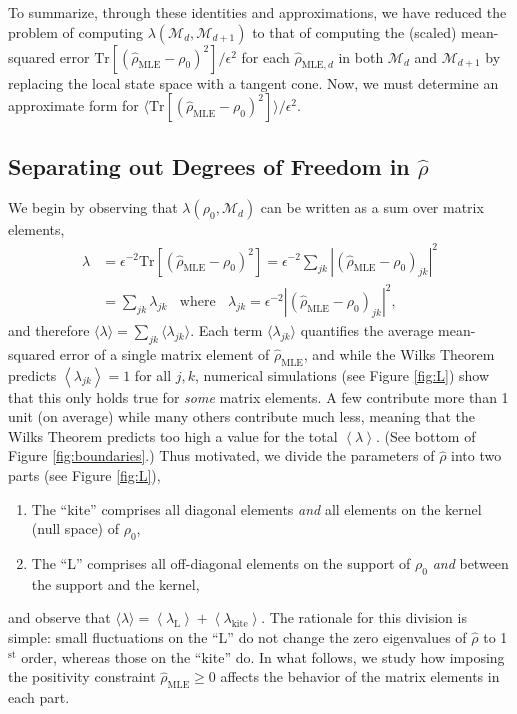 \documentclass[aps,pra, twocolumn]{revtex4-1}
\newcommand{\M}{\mathcal{M}}
\newcommand{\expect}[1]{\ensuremath{\left\langle#1\right\rangle}}
\newcommand{\rhohat}{\hat{\rho}}
\newcommand{\rhoMLE}{\rhohat_{\scriptscriptstyle\mathrm{MLE}}}
\begin{document}


To summarize, through these identities and approximations, we have reduced the problem of computing $\lambda(\M_{d}, \M_{d+1})$ to that of computing the (scaled) mean-squared error $\mathrm{Tr}[(\rhoMLE - \rho_{0})^{2}]/\epsilon^{2}$ for each $\hat{\rho}_{\mathrm{MLE},d}$ in both $\M_{d}$ and $\M_{d+1}$ by replacing the local state space with a tangent cone.
Now, we must determine an approximate form for $\langle\mathrm{Tr}[(\rhoMLE - \rho_{0})^{2}]\rangle/\epsilon^{2}$.

\subsection{Separating out Degrees of Freedom in $\rhohat$}

We begin by observing that $\lambda(\rho_{0}, \M_{d})$ can be written as a sum over matrix elements,
\begin{align}
\label{eq:llrserrors}
\nonumber \lambda &=\epsilon^{-2}\mathrm{Tr}[(\rhoMLE - \rho_{0})^{2}] = \epsilon^{-2}\sum_{jk}|(\rhoMLE- \rho_{0} )_{jk}|^{2}\\
&= \sum_{jk}\lambda_{jk}~~~~\text{where}~~~~\lambda_{jk} = \epsilon^{-2}|(\rhoMLE - \rho_{0} )_{jk} |^{2},
\end{align}
and therefore $\langle \lambda \rangle = \sum_{jk}\langle\lambda_{jk}\rangle$.  Each term $\langle \lambda_{jk}\rangle$ quantifies the average mean-squared error of a single matrix element of $\rhoMLE$, and while the Wilks Theorem predicts $\expect{\lambda_{jk}}=1$ for all $j,k$, numerical simulations (see Figure \ref{fig:L}) show that this only holds true for \emph{some} matrix elements.  A few contribute more than 1 unit (on average) while many others contribute much less, meaning that the Wilks Theorem predicts too high a value for the total $\expect{\lambda}$.  (See bottom of Figure \ref{fig:boundaries}.) Thus motivated, we divide the parameters of $\rhohat$ into two parts (see Figure \ref{fig:L}),
\begin{enumerate}[noitemsep]
\item The ``kite'' comprises all diagonal elements \emph{and} all elements on the kernel (null space) of $\rho_0$,
\item The ``L'' comprises all off-diagonal elements on the support of $\rho_0$ \emph{and} between the support and the kernel,
\end{enumerate}
and observe that $\langle\lambda\rangle = \expect{\lambda_{\mathrm{L}}} + \expect{\lambda_{\mathrm{kite}}}$.  The rationale for this division is simple:  small fluctuations on the ``L'' do not change the zero eigenvalues of $\hat\rho$ to 1$^{\mathrm{st}}$ order, whereas those on the ``kite'' do. In what follows, we study how imposing the positivity constraint $\rhoMLE \geq 0$ affects the behavior of the matrix elements in each part.
\end{document}
